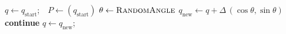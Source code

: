 \documentclass[11pt]{article}
\begin{document}
\begin{algorithm}[t]
\caption{Random walk}
\begin{algorithmic}[1]
  \State $q \gets q_{\text{start}}$;\ \ $P \gets (q_{\text{start}})$
  \Repeat
    \State $\theta \gets \textsc{RandomAngle}$
    \State $q_{\text{new}} \gets q + \Delta\,(\cos\theta, \sin\theta)$
      \State \textbf{continue}
    \EndIf
    \State $q \gets q_{\text{new}}$;\ \ 
      \State \Return {}
    \EndIf
\EndFunction
\end{algorithmic}
\end{algorithm}
\end{document}
